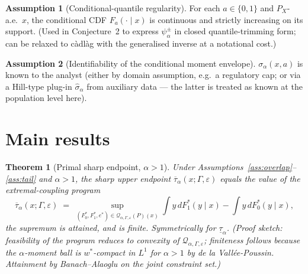 \documentclass[11pt]{article}
\theoremstyle{definition}
\newtheorem{assumption}{Assumption}
\theoremstyle{plain}
\newtheorem{theorem}{Theorem}
\theoremstyle{remark}
\begin{document}
\begin{assumption}[Conditional-quantile regularity]\label{ass:quantile}
For each $a \in \{0,1\}$ and $P_X$-a.e.\ $x$, the conditional CDF $F_a(\cdot \mid x)$ is continuous and strictly increasing on its support. (Used in Conjecture~2 to express $\psi^\pm_\alpha$ in closed quantile-trimming form; can be relaxed to càdlàg with the generalised inverse at a notational cost.)
\end{assumption}

\begin{assumption}[Identifiability of the conditional moment envelope]\label{ass:sigma}
$\sigma_\alpha(x, a)$ is known to the analyst (either by domain assumption, e.g.\ a regulatory cap; or via a Hill-type plug-in $\widehat{\sigma}_\alpha$ from auxiliary data — the latter is treated as known at the population level here).
\end{assumption}

\section{Main results}

\begin{theorem}[Primal sharp endpoint, $\alpha > 1$]\label{thm:primal}
Under Assumptions~\ref{ass:overlap}--\ref{ass:tail} and $\alpha > 1$, the sharp upper endpoint $\overline{\tau}_\alpha(x;\Gamma,\varepsilon)$ equals the value of the extremal-coupling program
$$\overline{\tau}_\alpha(x;\Gamma,\varepsilon) \;=\; \sup_{(F^*_0,F^*_1,e^*) \in \mathcal{Q}_{\alpha,\Gamma,\varepsilon}(P)(x)} \int y\,dF^*_1(y\mid x) - \int y\,dF^*_0(y\mid x),$$
the supremum is attained, and is finite. Symmetrically for $\underline{\tau}_\alpha$.
(Proof sketch: feasibility of the program reduces to convexity of $\mathcal{Q}_{\alpha,\Gamma,\varepsilon}$; finiteness follows because the $\alpha$-moment ball is $w^*$-compact in $L^1$ for $\alpha > 1$ by de la Vallée-Poussin. Attainment by Banach–Alaoglu on the joint constraint set.)
\end{theorem}
\end{document}
